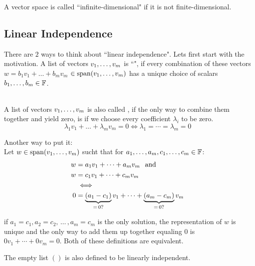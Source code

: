 \setcounter{thm}{12}
\begin{mydef}
  A vector space is called ``infinite-dimensional" if it is not finite-dimensional.
\end{mydef}

\pagebreak

\subsection{Linear Independence}

\setcounter{thm}{14}
\begin{mydef}
  There are $2$ ways to think about ``linear independence". Lets first start with the motivation. A list of vectors $v_1, \dots, v_m$ is ``\lid", if every combination of these vectors $w = b_1v_1 + \dots+ b_mv_m$ $\in \operatorname{span} (v_1, \dots, v_m)$ has a unique choice of scalars $b_1, \dots, b_m \in \mathbb{F}$.

   \\
  A list of vectors $v_1, \dots, v_m$ is also called \lid, if the only way to combine them together and yield zero, is if we choose every coefficient $\lambda_i$ to be zero.
  \begin{equation}
    \lambda_1v_1 + \dots + \lambda_mv_m = 0 \iff \lambda_1 = \cdots = \lambda_m = 0
  \end{equation}

  Another way to put it:\\
  Let $w\in \operatorname{span} (v_1, \dots, v_m)$ sucht that for $a_1, \dots, a_m, c_1, \dots, c_m \in \mathbb{F}$:
  \begin{equation}
    \begin{aligned}
      w & =a_1 v_1 + \cdots + a_m v_m \;\;\, \text{and}\;\; \\
      w & =c_1 v_1 + \cdots + c_m v_m \\
      & \iff \\
      0 & = \underbrace{(a_1 - c_1)}_{= \, 0\text{?}} v_1 + \cdots + \underbrace{(a_m -c_m)}_{= \, 0\text{?}} v_m
    \end{aligned}
  \end{equation}

  if $a_1 = c_1, a_2 = c_2, \, \dots \, , a_m = c_m$ is the only solution, the representation of $w$ is unique and the only way to add them up together equaling $0$ is $0v_1+\cdots+0v_m=0$. Both of these definitions are equivalent.

  The empty list $()$ is also defined to be linearly independent.
\end{mydef}




